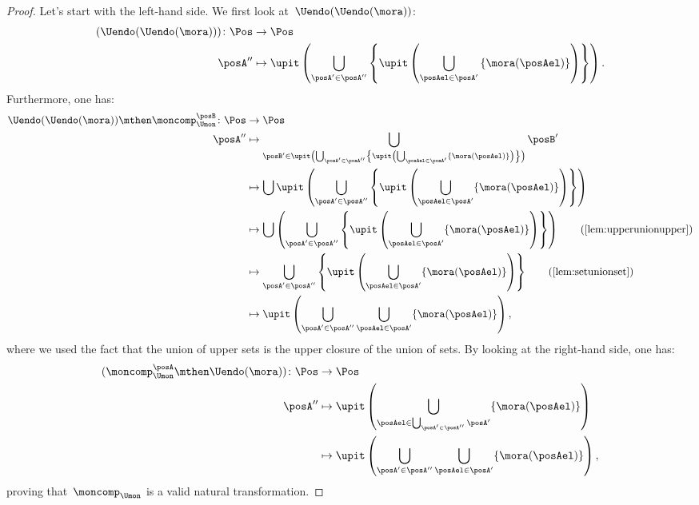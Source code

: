 \begin{proof}
    Let's start with the left-hand side.
    We first look at~$\Uendo(\Uendo(\mora))$:
    \begin{equation}
        \begin{aligned}
            (\Uendo(\Uendo(\mora)))
            \colon \Pos & \to \Pos \\
            \posA''     & \mapsto \upit \left( \bigcup_{\posA' \in \posA''}\left \{ \upit \left( \bigcup_{\posAel \in \posA'} \left\{ \mora(\posAel)\right\}\right)\right\}\right).
        \end{aligned}
    \end{equation}
    Furthermore, one has:
    \begin{equation}
        \begin{aligned}
            \Uendo(\Uendo(\mora))\mthen \moncomp_{\Umon}^{\posB}\colon \Pos & \to \Pos \\
            \posA''                                                         & \mapsto \bigcup_{\posB'\in \upit \left( \bigcup_{\posA'\in \posA''} \left\{ \upit \left( \bigcup_{\posAel \in \posA'} \{ \mora(\posAel)\}\right)\right\} \right)} \posB' \\
                                                                            & \mapsto \bigcup \upit \left( \bigcup_{\posA'\in \posA''} \left\{ \upit \left( \bigcup_{\posAel \in \posA'} \{ \mora(\posAel)\}\right)\right\} \right) \\
                                                                            & \mapsto \bigcup  \left( \bigcup_{\posA'\in \posA''} \left\{ \upit \left( \bigcup_{\posAel \in \posA'} \{ \mora(\posAel)\}\right)\right\} \right) \quad \quad (\text{\cref{lem:upperunionupper}}) \\
                                                                            & \mapsto   \bigcup_{\posA'\in \posA''} \left\{ \upit \left( \bigcup_{\posAel \in \posA'} \{ \mora(\posAel)\}\right)\right\} \quad \quad (\text{\cref{lem:setunionset}}) \\
                                                                            & \mapsto   \upit \left(\bigcup_{\posA'\in \posA''}  \bigcup_{\posAel \in \posA'} \{ \mora(\posAel)\}\right),
        \end{aligned}
    \end{equation}
    where we used the fact that the union of upper sets is the upper closure of the union of sets.
    By looking at the right-hand side, one has:
    \begin{equation}
        \begin{aligned}
            (\moncomp_{\Umon}^\posA \mthen \Uendo(\mora))
            \colon \Pos & \to \Pos \\
            \posA''     & \mapsto \upit \left( \bigcup_{\posAel \in \bigcup_{\posA'\in \posA''}\posA'} \{ \mora(\posAel)\}\right) \\
                        & \mapsto \upit \left( \bigcup_{\posA'\in \posA''}\bigcup_{\posAel \in \posA'}\{\mora(\posAel)\}\right),
        \end{aligned}
    \end{equation}
    proving that~$\moncomp_{\Umon}$ is a valid natural transformation.


\end{proof}
